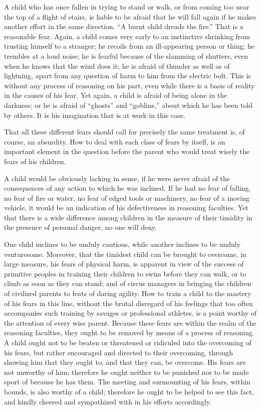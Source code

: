 \documentclass[
]{book}
\begin{document}
A child who has once fallen in trying to stand or walk, or from coming too near the top of a flight of stairs, is liable to be afraid that he will fall again if he makes another effort in the same direction. ``A burnt child dreads the fire.'' That is a reasonable fear. Again, a child comes very early to an instinctive shrinking from trusting himself to a stranger; he recoils from an ill-appearing person or thing; he trembles at a loud noise; he is fearful because of the slamming of shutters, even when he knows that the wind does it; he is afraid of thunder as well as of lightning, apart from any question of harm to him from the electric bolt. This is without any process of reasoning on his part, even while there is a basis of reality in the causes of his fear. Yet again, a child is afraid of being alone in the darkness; or he is afraid of ``ghosts'' and ``goblins,'' about which he has been told by others. It is his imagination that is at work in this case.

That all these different fears should call for precisely the same treatment is, of course, an absurdity. How to deal with each class of fears by itself, is an important element in the question before the parent who would treat wisely the fears of his children.

A child would be obviously lacking in sense, if he were never afraid of the consequences of any action to which he was inclined. If he had no fear of falling, no fear of fire or water, no fear of edged tools or machinery, no fear of a moving vehicle, it would be an indication of his defectiveness in reasoning faculties. Yet that there is a wide difference among children in the measure of their timidity in the presence of personal danger, no one will deny.

One child inclines to be unduly cautious, while another inclines to be unduly venturesome. Moreover, that the timidest child can be brought to overcome, in large measure, his fears of physical harm, is apparent in view of the success of primitive peoples in training their children to swim before they can walk, or to climb as soon as they can stand; and of circus managers in bringing the children of civilized parents to feats of daring agility. How to train a child to the mastery of his fears in this line, without the brutal disregard of his feelings that too often accompanies such training by savages or professional athletes, is a point worthy of the attention of every wise parent. Because these fears are within the realm of the reasoning faculties, they ought to be removed by means of a process of reasoning. A child ought not to be beaten or threatened or ridiculed into the overcoming of his fears, but rather encouraged and directed to their overcoming, through showing him that they ought to, and that they can, be overcome. His fears are not unworthy of him; therefore he ought neither to be punished nor to be made sport of because he has them. The meeting and surmounting of his fears, within bounds, is also worthy of a child; therefore he ought to be helped to see this fact, and kindly cheered and sympathized with in his efforts accordingly.
\end{document}
